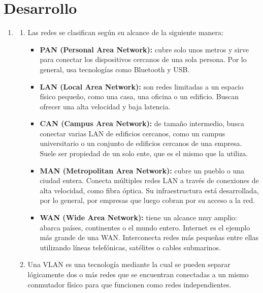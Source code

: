 \documentclass[11pt,a4paper]{article}
\begin{document}
\section{Desarrollo}
\begin{enumerate}
  \item
    \begin{enumerate}
      \item
        Las redes se clasifican seg\'un su alcance de la siguiente manera:
        \begin{itemize}
          \item \textbf{PAN (Personal Area Network):} cubre solo unos metros y sirve para conectar los dispositivos cercanos de una sola persona. Por lo general, usa tecnolog\'ias como Bluetooth y USB.
          \item \textbf{LAN (Local Area Network):} son redes limitadas a un espacio f\'isico peque\~no, como una casa, una oficina o un edificio. Buscan ofrecer una alta velocidad y baja latencia.
          \item \textbf{CAN (Campus Area Network):} de tama\~no intermedio, busca conectar varias LAN de edificios cercanos, como un campus universitario o un conjunto de edificios cercanos de una empresa. Suele ser propiedad de un solo ente, que es el mismo que la utiliza.
          \item \textbf{MAN (Metropolitan Area Network):} cubre un pueblo o una ciudad entera. Conecta m\'ultiples redes LAN a trav\'es de conexiones de alta velocidad, como fibra \'optica. Su infraestructura est\'a desarrollada, por lo general, por empresas que luego cobran por su acceso a la red.
          \item \textbf{WAN (Wide Area Network):} tiene un alcance muy amplio: abarca pa\'ises, continentes o el mundo entero. Internet es el ejemplo m\'as grande de una WAN. Interconecta redes m\'as peque\~nas entre ellas utilizando l\'ineas telef\'onicas, sat\'elites o cables submarinos.
        \end{itemize}
      \item
        Una VLAN es una tecnolog\'ia mediante la cual se pueden separar l\'ogicamente dos o m\'as redes que se encuentran conectadas a un mismo conmutador f\'isico para que funcionen como redes independientes.


\end{enumerate}
\end{enumerate}
\end{document}
